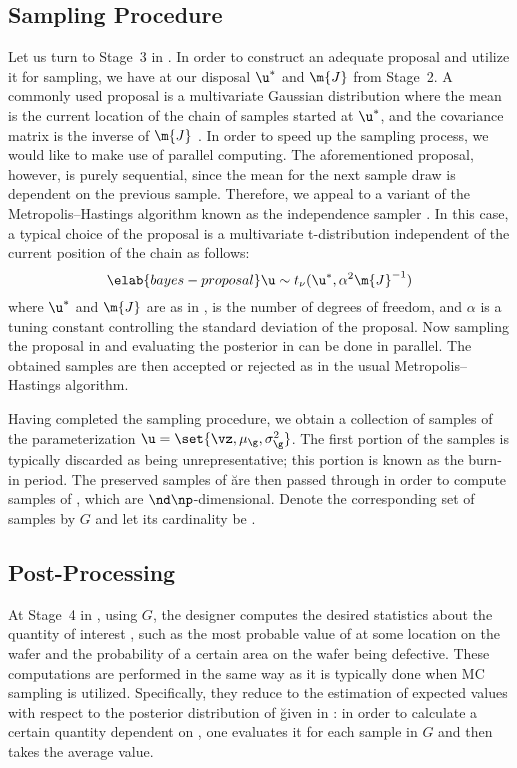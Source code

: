 \subsection{Sampling Procedure}

Let us turn to Stage~3 in . In order to construct an
adequate proposal and utilize it for sampling, we have at our disposal $\u^*$
and $\m{J}$ from Stage~2. A commonly used proposal is a multivariate Gaussian
distribution where the mean is the current location of the chain of samples
started at $\u^*$, and the covariance matrix is the inverse of $\m{J}$
\cite{gelman2013}. In order to speed up the sampling process, we would like to
make use of parallel computing. The aforementioned proposal, however, is purely
sequential, since the mean for the next sample draw is dependent on the previous
sample. Therefore, we appeal to a variant of the Metropolis--Hastings algorithm
known as the independence sampler \cite{gelman2013}. In this case, a typical
choice of the proposal is a multivariate t-distribution independent of the
current position of the chain as follows:
\begin{equation} \elab{bayes-proposal}
  \u \sim t_\nu(\u^*, \alpha^2 \m{J}^{-1})
\end{equation}
where $\u^*$ and $\m{J}$ are as in , \nu is the number
of degrees of freedom, and $\alpha$ is a tuning constant controlling the
standard deviation of the proposal. Now sampling the proposal in
 and evaluating the posterior in  can
be done in parallel. The obtained samples are then accepted or rejected as in
the usual Metropolis--Hastings algorithm.

Having completed the sampling procedure, we obtain a collection of samples of
the parameterization $\u = \set{\vz, \mu_\g, \sigma^2_\g}$. The first portion of
the samples is typically discarded as being unrepresentative; this portion is
known as the burn-in period. The preserved samples of \u are then passed through
 in order to compute samples of \g, which are $\nd
\np$-dimensional. Denote the corresponding set of samples by $G$ and let its
cardinality be \no.

\subsection{Post-Processing}

At Stage~4 in , using $G$, the designer computes the
desired statistics about the quantity of interest \g, such as the most probable
value of \g at some location on the wafer and the probability of a certain area
on the wafer being defective. These computations are performed in the same way
as it is typically done when \ac{MC} sampling is utilized. Specifically, they
reduce to the estimation of expected values with respect to the posterior
distribution of \u given in : in order to calculate a
certain quantity dependent on \g, one evaluates it for each sample in $G$ and
then takes the average value.

